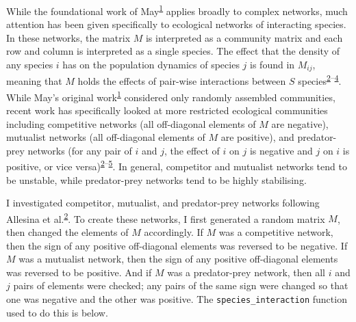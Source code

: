 \documentclass[]{article}
\begin{document}
While the foundational work of
May\textsuperscript{\protect\hyperlink{ref-May1972}{1}} applies broadly
to complex networks, much attention has been given specifically to
ecological networks of interacting species. In these networks, the
matrix \(M\) is interpreted as a community matrix and each row and
column is interpreted as a single species. The effect that the density
of any species \(i\) has on the population dynamics of species \(j\) is
found in \(M_{ij}\), meaning that \(M\) holds the effects of pair-wise
interactions between \(S\)
species\textsuperscript{\protect\hyperlink{ref-Allesina2012}{2}--\protect\hyperlink{ref-Tang2014b}{4}}.
While May's original
work\textsuperscript{\protect\hyperlink{ref-May1972}{1}} considered only
randomly assembled communities, recent work has specifically looked at
more restricted ecological communities including competitive networks
(all off-diagonal elements of \(M\) are negative), mutualist networks
(all off-diagonal elements of \(M\) are positive), and predator-prey
networks (for any pair of \(i\) and \(j\), the effect of \(i\) on \(j\)
is negative and \(j\) on \(i\) is positive, or vice
versa)\textsuperscript{\protect\hyperlink{ref-Allesina2012}{2}--\protect\hyperlink{ref-Allesina2011}{5}}.
In general, competitor and mutualist networks tend to be unstable, while
predator-prey networks tend to be highly stabilising.

I investigated competitor, mutualist, and predator-prey networks
following Allesina et
al.\textsuperscript{\protect\hyperlink{ref-Allesina2012}{2}}. To create
these networks, I first generated a random matrix \(M\), then changed
the elements of \(M\) accordingly. If \(M\) was a competitive network,
then the sign of any positive off-diagonal elements was reversed to be
negative. If \(M\) was a mutualist network, then the sign of any
positive off-diagonal elements was reversed to be positive. And if \(M\)
was a predator-prey network, then all \(i\) and \(j\) pairs of elements
were checked; any pairs of the same sign were changed so that one was
negative and the other was positive. The \texttt{species\_interaction}
function used to do this is below.
\end{document}

